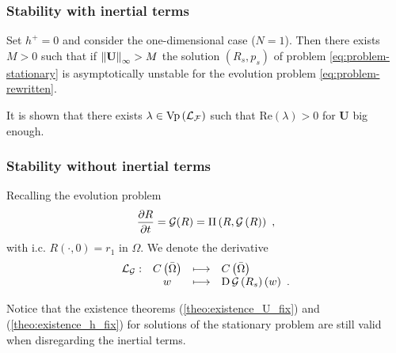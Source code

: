\documentclass[10pt,aspectratio=169]{beamer}
\begin{document}

\begin{frame}
\frametitle{Stability with inertial terms}
\begin{theorem}\label{theo:instabilite-avec-inertie-U-fixe} Set $h^+=0$ and consider the one-dimensional case ($N=1$). Then there exists $M>0$ such that if $\left\lVert\mathbf{U}\right\rVert_{\infty}>M$ the solution $\left(R_s,p_s\right)$ of problem \eqref{eq:problem-stationary} is asymptotically unstable for the evolution problem \eqref{eq:problem-rewritten}.
\end{theorem}\bigskip
It is shown that there exists $\lambda\in \textnormal{Vp}\left(\mathcal{L}_\mathcal{F}\right)$ such that $\mbox{Re}(\lambda)>0$ for $\mathbf{U}$ big enough.
\end{frame}


\begin{frame}\frametitle{Stability without inertial terms}
Recalling the evolution problem
\begin{equation}
\frac{\partial R}{\partial t}=\mathcal{G}(R)=\Pi\left(R,\mathcal{G}\left(R\right)\right)~,
\end{equation}
with i.c. $R\left(\cdot,0\right)=r_1$ in $\Omega$. We denote the derivative
\begin{equation}
\begin{array}{cccl}
\mathcal{L}_\mathcal{G}:&C\left(\bar{\Omega}\right)&\longmapsto& C\left(\bar{\Omega}\right)\\
&w& \longmapsto & \textnormal{D}\,\mathcal{G}\left(R_s\right)\left(w\right)~.\label{eq:def-L_G}
\end{array}
\end{equation} 
\bigskip

Notice that the existence theorems (\ref{theo:existence_U_fix}) and (\ref{theo:existence_h_fix}) for solutions of the stationary problem are still valid when disregarding the inertial terms.
\end{frame}

\end{document}
